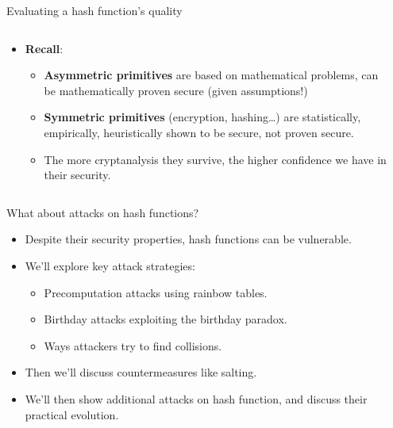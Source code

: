\documentclass[aspectratio=169, lualatex, handout]{beamer}
\begin{document}
\begin{frame}{Evaluating a hash function's quality}
	\begin{columns}[c]
		\begin{column}{0.6\textwidth}
			\begin{itemize}
				\item \textbf{Recall}:
				      \begin{itemize}
					      \item \textbf{Asymmetric primitives} are based on mathematical
					            problems, can be mathematically proven secure (given assumptions!)
					      \item \textbf{Symmetric primitives} (encryption, hashing\ldots)
					            are statistically, empirically, heuristically shown to be secure,
					            not proven secure.
					      \item The more cryptanalysis they survive, the higher confidence
					            we have in their security.
				      \end{itemize}
			\end{itemize}
		\end{column}

		\begin{column}{0.4\textwidth}
		\end{column}
	\end{columns}
\end{frame}

\begin{frame}{What about attacks on hash functions?}
	\begin{itemize}
		\item Despite their security properties, hash functions can be vulnerable.
		\item We'll explore key attack strategies:
		      \begin{itemize}
			      \item Precomputation attacks using rainbow tables.
			      \item Birthday attacks exploiting the birthday paradox.
			      \item Ways attackers try to find collisions.
		      \end{itemize}
		\item Then we'll discuss countermeasures like salting.
		\item We'll then show additional attacks on hash function, and discuss their practical evolution.
	\end{itemize}
\end{frame}
\end{document}

